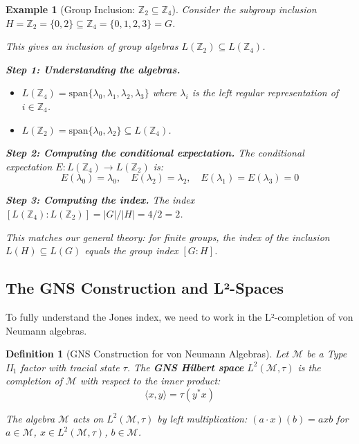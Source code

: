 \documentclass[11pt, a4paper]{article}
\theoremstyle{colored_def}
\newtheorem{definition}{Definition}[section]
\theoremstyle{colored_thm}
\theoremstyle{colored_ex}
\newtheorem{example}{Example}[section]
\newcommand{\M}{\mathcal{M}}
\newcommand{\spn}{\text{span}}
\begin{document}
\begin{example}[Group Inclusion: $\mathbb{Z}_2 \subseteq \mathbb{Z}_4$]\label{ex:group-inclusion}
Consider the subgroup inclusion $H = \mathbb{Z}_2 = \{0, 2\} \subseteq \mathbb{Z}_4 = \{0, 1, 2, 3\} = G$.

This gives an inclusion of group algebras $L(\mathbb{Z}_2) \subseteq L(\mathbb{Z}_4)$.

\textbf{Step 1: Understanding the algebras.}
\begin{itemize}
    \item $L(\mathbb{Z}_4) = \spn\{\lambda_0, \lambda_1, \lambda_2, \lambda_3\}$ where $\lambda_i$ is the left regular representation of $i \in \mathbb{Z}_4$.
    \item $L(\mathbb{Z}_2) = \spn\{\lambda_0, \lambda_2\} \subseteq L(\mathbb{Z}_4)$.
\end{itemize}

\textbf{Step 2: Computing the conditional expectation.}
The conditional expectation $E: L(\mathbb{Z}_4) \to L(\mathbb{Z}_2)$ is:
$$ E(\lambda_0) = \lambda_0, \quad E(\lambda_2) = \lambda_2, \quad E(\lambda_1) = E(\lambda_3) = 0 $$

\textbf{Step 3: Computing the index.}
The index $[L(\mathbb{Z}_4) : L(\mathbb{Z}_2)] = |G|/|H| = 4/2 = 2$.

This matches our general theory: for finite groups, the index of the inclusion $L(H) \subseteq L(G)$ equals the group index $[G : H]$.
\end{example}

\subsection{The GNS Construction and L²-Spaces}

To fully understand the Jones index, we need to work in the L²-completion of von Neumann algebras.

\begin{definition}[GNS Construction for von Neumann Algebras]
Let $\M$ be a Type II$_1$ factor with tracial state $\tau$. The \textbf{GNS Hilbert space} $L^2(\M, \tau)$ is the completion of $\M$ with respect to the inner product:
$$ \langle x, y \rangle = \tau(y^*x) $$

The algebra $\M$ acts on $L^2(\M, \tau)$ by left multiplication: $(a \cdot x)(b) = axb$ for $a \in \M$, $x \in L^2(\M, \tau)$, $b \in \M$.
\end{definition}
\end{document}
